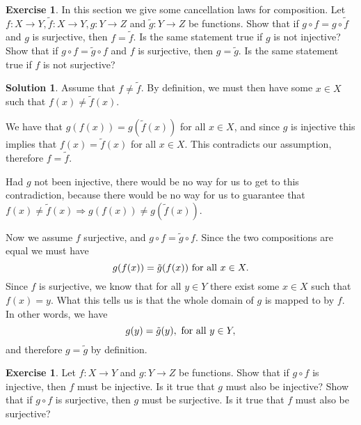 \documentclass[a4paper, twocolumn]{report}
\newcounter{exercise} \numberwithin{exercise}{section}
\theoremstyle{definition}
\newtheorem{exc}[exercise]{Exercise}
\theoremstyle{solution}
\newtheorem*{sltn}{Solution}
\begin{document}
\begin{exc}
  In this section we give some cancellation laws for composition.  Let $f : X
  \rightarrow Y, \tilde{f} : X \rightarrow Y, g : Y \rightarrow Z$ and
  $\tilde{g} : Y \rightarrow Z$ be functions.  Show that if $g \circ f = g
  \circ \tilde{f}$ and $g$ is surjective, then $f = \tilde{f}$. Is the same
  statement true if $g$ is not injective? Show that if $g \circ f = \tilde{g}
  \circ f$ and $f$ is surjective, then $g = \tilde{g}$. Is the same statement
  true if $f$ is not surjective?
\end{exc}

\begin{sltn}
  Assume that $f \neq \tilde{f}$. By definition, we must then have some $x \in
  X$ such that $f(x) \neq \tilde{f}(x)$. 

  We have that $g(f(x)) = g(\tilde{f}(x))$ for all $x \in X$, and since $g$ is
  injective this implies that $f(x) = \tilde{f}(x)$ for all $x \in X$. This
  contradicts our assumption, therefore $f = \tilde{f}$.

  Had $g$ not been injective, there would be no way for us to get to this
  contradiction, because there would be no way for us to guarantee that $f(x)
  \neq \tilde{f}(x) \Rightarrow g(f(x)) \neq g(\tilde{f}(x))$.

  Now we assume $f$ surjective, and $g \circ f = \tilde{g} \circ f$.  
  Since the two compositions are equal we must have
  \begin{equation}
    \notag
    g(f(x)) = \tilde{g}(f(x)) \text{ for all } x \in X.
  \end{equation}
  Since $f$ is surjective, we know that for all $y \in Y$ there exist some $x
  \in X$ such that $f(x) = y$. What this tells us is that the whole domain of
  $g$ is mapped to by $f$. In other words, we have
  \begin{equation}
    \notag
    g(y) = \tilde{g}(y), \text{ for all } y \in Y, 
  \end{equation}
  and therefore $g = \tilde{g}$ by definition.
\end{sltn}

\begin{exc}
  Let $f : X \rightarrow Y$ and $g : Y \rightarrow Z$ be functions. Show that if $g \circ f$ is injective, then $f$
  must be injective. Is it true that $g$ must also be injective? Show that if $g \circ f$ is surjective, then $g$ must be surjective.
  Is it true that $f$ must also be surjective?
\end{exc}
\end{document}
